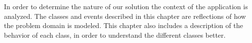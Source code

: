 In order to determine the nature of our solution the context of the application is analyzed.
The classes and events described in this chapter are reflections of how the problem domain is modeled. 
This chapter also includes a description of the behavior of each class, in order to understand the different classes better.







